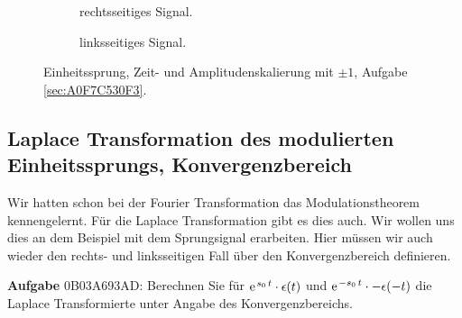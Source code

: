 \documentclass[11pt,a4paper,DIV=12]{scrartcl}
\numberwithin{equation}{section}
\numberwithin{figure}{section}
\begin{document}
\begin{figure*}[h!]
\begin{subfigure}{0.45\textwidth}
\caption{rechtsseitiges Signal.}
\end{subfigure}
%
\begin{subfigure}{0.45\textwidth}
\caption{linksseitiges Signal.}
\end{subfigure}
%
%
%
\caption{Einheitssprung, Zeit- und Amplitudenskalierung mit $\pm 1$,
Aufgabe \ref{sec:A0F7C530F3}.}
\label{fig:A0F7C530F3}
\end{figure*}




\clearpage
\subsection{Laplace Transformation des modulierten Einheitssprungs,
Konvergenzbereich}
\label{sec:0B03A693AD}
\begin{Ziel}
Wir hatten schon bei der Fourier Transformation das Modulationstheorem
kennengelernt. Für die Laplace Transformation gibt es dies auch.
Wir wollen uns dies an dem Beispiel mit dem Sprungsignal erarbeiten.
Hier müssen wir auch wieder den rechts- und linksseitigen Fall über den
Konvergenzbereich definieren.
\end{Ziel}
\textbf{Aufgabe} {\tiny 0B03A693AD}: Berechnen Sie für $\e^{s_0 \, t} \cdot \epsilon(t)$
und $\e^{-s_0 \, t} \cdot -\epsilon(-t)$ die Laplace Transformierte unter Angabe
des Konvergenzbereichs.
\end{document}
